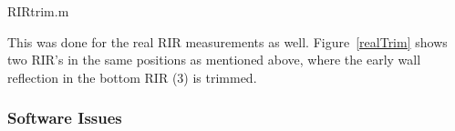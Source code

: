 \documentclass[../../main.tex]{subfiles}
\begin{document}






		RIRtrim.m

		This was done for the real \ac{RIR} measurements as well. Figure~\ref{realTrim} shows two \ac{RIR}'s in the same positions as mentioned above, where the early wall reflection in the bottom \ac{RIR} (3) is trimmed.



		\subsubsection{Software Issues}
	\label{iteration3Issues}


	
\end{document}
